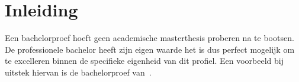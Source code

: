 \chapter{Inleiding}
\label{sec:inleiding}


%
%
%
%
%
%

Een bachelorproef hoeft geen academische masterthesis proberen na te bootsen. De professionele bachelor heeft zijn eigen waarde het is dus perfect mogelijk om te excelleren binnen de specifieke eigenheid van dit profiel. Een voorbeeld bij uitstek hiervan is de bachelorproef van~\textcite{VanDerPlaetsen2013}.
